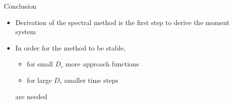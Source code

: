 \begin{comment}
\begin{frame}{Elongational flow: Stability analysis}
	\begin{columns}
		\begin{column}{0.5\textwidth}
			\begin{figure}
				\texttt{[image: Bilder/elongational\_l=1\_lsg\_ueber\_Zeit\_14th]}
				\caption{Coefficients as function of time}
			\end{figure}
		\end{column}
		\begin{column}{0.5\textwidth}
			\begin{figure}
				\texttt{[image: Bilder/Stability\_analysis\_14th\_dr0.1]}
				\caption{Eigenvalue of matrix $A$}
			\end{figure}
		\end{column}
	\end{columns}
	\centering
	With $14th.$ order and $D_r = 0.1$.
\end{frame}
\end{comment}


\begin{comment}
\begin{frame}{Elongational flow: Stability analysis}
	\begin{figure}
		\centering
		\begin{minipage}{0.4\linewidth}
			\texttt{[image: Bilder/Stability\_analysis\_2nd\_dr1]}
		\end{minipage}
		\hspace{1cm}
		\begin{minipage}{0.4\linewidth}
			\centering
			\texttt{[image: Bilder/Stability\_analysis\_2nd\_dr0.14]}
		\end{minipage}
		\caption{Eigenvalue of matrix $A$ with basis functions of $2nd.$ order}
	\end{figure}
	
	\begin{block}{Finding 1}
		The maximum value of eigenvalue of matrix $A$ with basis functions of $2nd.$ order is $0.01714 > 0$. It follows:
		Sprectal method for $2nd.$ order is unstable with $D_r < 0.15$.
	\end{block}
\end{frame}
\end{comment}


\begin{frame}{Conclusion}
		\begin{itemize}
			\item Derivation of the spectral method is the first step to derive the moment system
			\item In order for the method to be stable,
				\begin{itemize}
					\item for small $D_r$ more approach functions 
					\item for large $D_r$ smaller time steps 
				\end{itemize} 
			are needed
		\end{itemize}
\end{frame}



